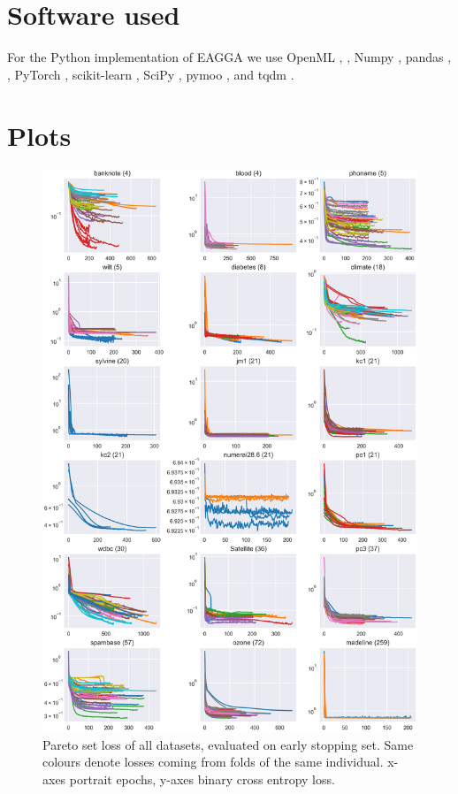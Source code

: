 \documentclass[twoside,11pt]{article}
\begin{document}
\vskip 0.2in



\appendix
\section{Software used}
For the Python implementation of EAGGA we use OpenML \citep{OpenML}, \citep{OpenMLPython},
Numpy \citep{numpy},
pandas \citep{pandas1}, \citep{pandas2},
PyTorch \citep{PyTorch},
scikit-learn \citep{scikit-learn},
SciPy \citep{SciPy},
pymoo \citep{pymoo}, and
tqdm \citep{tqdm}.

\section{Plots}
\begin{figure}
  \centering
  \includegraphics[width=0.9\linewidth]{../code/export/plot_early_stopping_losses_pareto_set.png}
  \caption{Pareto set loss of all datasets, evaluated on early stopping set. Same colours denote losses coming from folds of the same individual.
            x-axes portrait epochs, y-axes binary cross entropy loss.}
  \label{fig-es-losses}
\end{figure}
\end{document}
